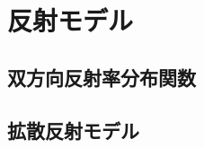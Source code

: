 \documentclass[../main]{subfiles}
\begin{document}
\graphicspath{{../figures/chap3/}}

\section{反射モデル}
\label{sec:pmethod_model}

\subsection{双方向反射率分布関数}
\label{subsec:pmethod_model_brdf}

\subsection{拡散反射モデル}
\label{subsec:pmethod_model_diffuse}
\end{document}
